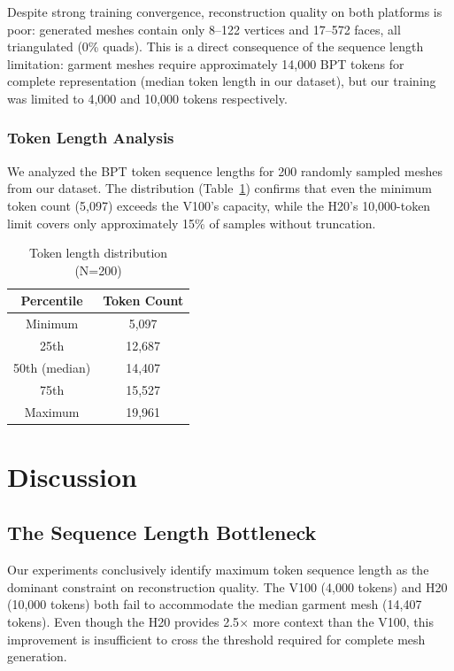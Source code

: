 \documentclass[conference]{IEEEtran}
\begin{document}
Despite strong training convergence, reconstruction quality on both platforms is poor: generated meshes contain only 8--122 vertices and 17--572 faces, all triangulated (0\% quads).
This is a direct consequence of the sequence length limitation: garment meshes require approximately 14,000 BPT tokens for complete representation (median token length in our dataset), but our training was limited to 4,000 and 10,000 tokens respectively.

\subsubsection{Token Length Analysis}

We analyzed the BPT token sequence lengths for 200 randomly sampled meshes from our dataset.
The distribution (Table~\ref{tab:tokens}) confirms that even the minimum token count (5,097) exceeds the V100's capacity, while the H20's 10,000-token limit covers only approximately 15\% of samples without truncation.

\begin{table}[h]
\centering
\caption{Token length distribution (N=200)}
\label{tab:tokens}
\begin{tabular}{cc}
\toprule
Percentile & Token Count \\
\midrule
Minimum & 5,097 \\
25th    & 12,687 \\
50th (median) & 14,407 \\
75th    & 15,527 \\
Maximum & 19,961 \\
\bottomrule
\end{tabular}
\end{table}

\section{Discussion}

\subsection{The Sequence Length Bottleneck}

Our experiments conclusively identify maximum token sequence length as the dominant constraint on reconstruction quality.
The V100 (4,000 tokens) and H20 (10,000 tokens) both fail to accommodate the median garment mesh (14,407 tokens).
Even though the H20 provides 2.5$\times$ more context than the V100, this improvement is insufficient to cross the threshold required for complete mesh generation.
\end{document}

